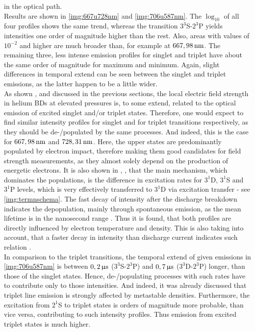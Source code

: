 \documentclass[a4paper,10pt,twoside]{article}
\newcommand{\tenpo}[1]{ 10^{#1}}
\newcommand{\ix}[1]{_\text{#1}}
\begin{document}
	\begin{multicols*}{2}
		
		in the optical path.\\
		Results are shown in \autoref{img:667u728nm} and \autoref{img:706u587nm}. The $\log\ix{10}$ of all four profiles shows the same trend, whereas the transition $3^3$S-$2^3$P yields intensities one order of magnitude higher than the rest. Also, areas with values of $\tenpo{-2}$ and higher are much broader than, for example at $\unit[667,98]{nm}$. The remaining three, less intense emission profiles for singlet and triplet have about the same order of magnitude for maximum and minimum. Again, slight differences in temporal extend can be seen between the singlet and triplet emissions, as the latter happen to be a little wider.\\
		As shown \cite{linratio1_14}, \cite{lineratio2_14} and discussed in the previous sections, the local electric field strength in helium BDs at elevated pressures is, to some extend, related to the optical emission of excited singlet and/or triplet states. Therefore, one would expect to find similar intensity profiles for singlet and for triplet transitions respectively, as they should be de-/populated by the same processes. And indeed, this is the case for $\unit[667,98]{nm}$ and $\unit[728,31]{nm}$. Here, the upper states are predominantly populated by electron impact, therefore making them good candidates for field strength measurements, as they almost solely depend on the production of energetic electrons. It is also shown in \cite{linratio1_14}, \cite{belmonte}, \cite{debreuil} that the main mechanism, which dominates the populations, is the difference in excitation rates for $3^1$D, $3^1$S and $3^1$P levels, which is very effectively transferred to $3^1$D via excitation transfer - see \autoref{img:termnschema}. The fast decay of intensity after the discharge breakdown indicates the depopulation, mainly through spontaneous emission, as the mean lifetime is in the nanosecond range \cite{linratio1_14}. Thus it is found, that both profiles are directly influenced by electron temperature and density. This is also taking into account, that a faster decay in intensity than discharge current indicates such relation \cite{electron_temp}.\\
		In comparison to the triplet transitions, the temporal extend of given emissions in \autoref{img:706u587nm} is between $\unit[0,2]{\upmu s}$ ($3^3$S-$2^3$P) and $\unit[0,7]{\upmu s}$ ($3^3$D-$2^3$P) longer, than those of the singlet states. Hence, de-/populating processes with such rates have to contribute only to those intensities. And indeed, it was already discussed that triplet line emission is strongly affected by metastable densities. Furthermore, the excitation from $2^1$S to triplet states is orders of magnitude more probable, than vice versa, contributing to such intensity profiles. Thus emission from excited triplet states is much higher.\\

\end{multicols*}
\end{document}
